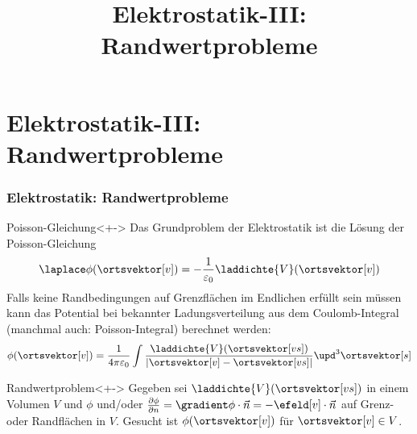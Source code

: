 

\title[TET: Elektrostatik-III: Randwertprobleme]{Elektrostatik-III: Randwertprobleme}


% 
% 

\maketitle

% 
% 
\section{Elektrostatik-III: Randwertprobleme}

\begin{frame}

  \frametitle{Elektrostatik: Randwertprobleme}

  \begin{block}{Poisson-Gleichung}<+->
    Das Grundproblem der Elektrostatik ist die Lösung der
    \alert{Poisson-Gleichung}
    $$
    \laplace \phi(\ortsvektor[v]) = -\frac{1}{\varepsilon_0}
    \laddichte{V} (\ortsvektor[v])
    $$
    Falls \alert{keine Randbedingungen auf Grenzflächen im Endlichen}
    erfüllt sein müssen kann das Potential bei bekannter
    Ladungsverteilung aus dem \alert{Coulomb-Integral} (manchmal auch:
    \alert{Poisson-Integral}) berechnet werden:
    $$
   \phi(\ortsvektor[v]) = \frac{1}{4\pi\varepsilon_0} \int
   \frac{\laddichte{V}(\ortsvektor[vs])}{|\ortsvektor[v]-\ortsvektor[vs]|}
   \upd^3\ortsvektor[s]
   $$
 \end{block}

 \begin{block}{Randwertproblem}<+->
   \alert{Gegeben} sei $\laddichte{V}(\ortsvektor[vs])$ in einem Volumen $V$ und \alert{$\phi$} und/oder \alert{$\frac{\partial\phi}{\partial n}=\gradient\phi\cdot\vec{n}=-\efeld[v] \cdot \vec{n}$} auf Grenz- oder Randflächen in $V$. \alert{Gesucht} ist $\phi(\ortsvektor[v])$ für $\ortsvektor[v] \in V$.   
   \end{block}
  
 \end{frame}

